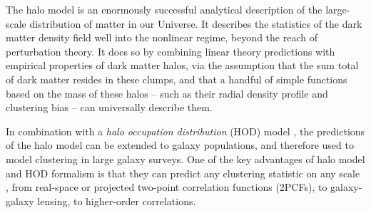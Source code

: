 \documentclass[5p]{elsarticle}
\newcommand{\bd}[1]{\textcolor{purple}{\textbf{[BD: #1]}}}
\begin{document}
The halo model \citep{Neyman1953,Peacock2000,Seljak2000,Ma2000,Cooray2002} is an enormously successful analytical description of the large-scale distribution of matter in our Universe.
It describes the statistics of the dark matter density field well into the nonlinear regime, beyond the reach of perturbation theory. 
It does so by combining linear theory predictions with empirical properties of dark matter halos, via the assumption that the sum total of dark matter resides in these clumps, and that a handful of simple functions based on the mass of these halos -- such as their radial density profile and clustering bias -- can universally describe them.

In combination with a \textit{halo occupation distribution} (HOD) model \citep{Kauffmann1997,Scoccimarro2001,Berlind2003,Zheng2005}, the predictions of the halo model can be extended to galaxy populations, and therefore used to model clustering in large galaxy surveys. 
One of the key advantages of halo model and HOD formalism is that they can predict any clustering statistic on any scale 
\citep{Zehavi2011}, from real-space or projected two-point correlation functions (2PCFs), to galaxy-galaxy lensing, to higher-order correlations.  
\end{document}
